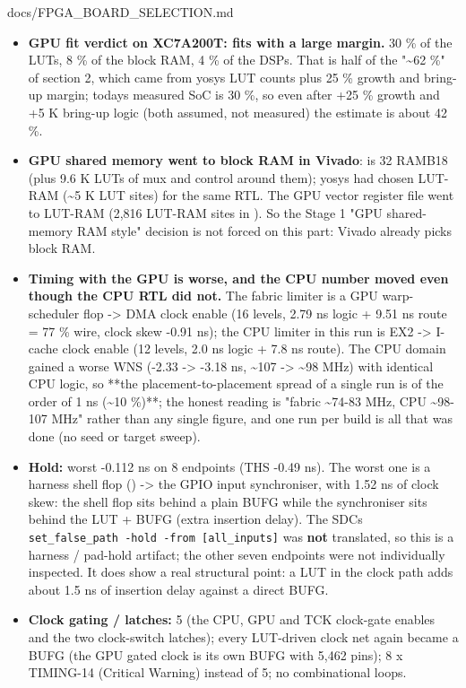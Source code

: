 \begin{relocated}{docs/FPGA_BOARD_SELECTION.md}
{}

\begin{itemize}
\tightlist
\item
  \textbf{GPU fit verdict on XC7A200T: fits with a large margin.} 30 \%
  of the LUTs, 8 \% of the block RAM, 4 \% of the DSPs. That is half of
  the "\textasciitilde62 \%" of section 2, which came from yosys LUT
  counts plus 25 \% growth and bring-up margin; today\textquotesingle s
  measured SoC is 30 \%, so even after +25 \% growth and +5 K bring-up
  logic (both assumed, not measured) the estimate is about 42 \%.
\item
  \textbf{GPU shared memory went to block RAM in Vivado}:
   is 32 RAMB18 (plus 9.6 K LUTs of mux and control
  around them); yosys had chosen LUT-RAM (\textasciitilde5 K LUT sites)
  for the same RTL. The GPU vector register file went to LUT-RAM (2,816
  LUT-RAM sites in ). So the Stage 1 "GPU shared-memory
  RAM style" decision is not forced on this part: Vivado already picks
  block RAM.
\item
  \textbf{Timing with the GPU is worse, and the CPU number moved even
  though the CPU RTL did not.} The fabric limiter is a GPU
  warp-scheduler  flop -\textgreater{} DMA
   clock enable (16 levels, 2.79 ns logic + 9.51 ns route
  = 77 \% wire, clock skew -0.91 ns); the CPU limiter in this run is EX2
   -\textgreater{} I-cache  clock
  enable (12 levels, 2.0 ns logic + 7.8 ns route). The CPU domain gained
  a worse WNS (-2.33 -\textgreater{} -3.18 ns, \textasciitilde107
  -\textgreater{} \textasciitilde98 MHz) with identical CPU logic, so
  **the placement-to-placement spread of a single run is of the order of
  1 ns (\textasciitilde10 \%)**; the honest reading is "fabric
  \textasciitilde74-83 MHz, CPU \textasciitilde98-107 MHz" rather than
  any single figure, and one run per build is all that was done (no seed
  or target sweep).
\item
  \textbf{Hold:} worst -0.112 ns on 8 endpoints (THS -0.49 ns). The
  worst one is a harness shell flop 
  () -\textgreater{} the GPIO input synchroniser,
  with 1.52 ns of clock skew: the shell flop sits behind a plain
   BUFG while the synchroniser sits behind the
   LUT + BUFG (extra insertion delay). The
  SDC\textquotesingle s
  \texttt{set\_\allowbreak{}false\_\allowbreak{}path\ -\allowbreak{}hold\ -\allowbreak{}from\ [all\_\allowbreak{}inputs]}
  was \textbf{not} translated, so this is a harness / pad-hold artifact;
  the other seven endpoints were not individually inspected. It does
  show a real structural point: a LUT in the clock path adds about 1.5
  ns of insertion delay against a direct BUFG.
\item
  \textbf{Clock gating / latches:} 5  (the CPU, GPU and TCK
  clock-gate enables and the two clock-switch latches); every LUT-driven
  clock net again became a BUFG (the GPU gated clock is its own BUFG
  with 5,462 pins); 8 x TIMING-14 (Critical Warning) instead of 5; no
  combinational loops.
\end{itemize}


\end{relocated}
